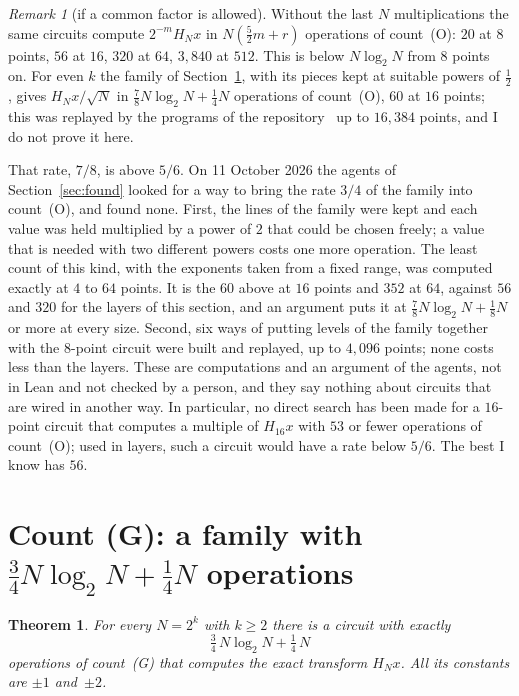 \documentclass[10pt]{article}
\newtheorem{theorem}{Theorem}
\theoremstyle{remark}
\newtheorem{remark}[proposition]{Remark}
\newcommand{\cntG}{\textup{(G)}}
\newcommand{\cntO}{\textup{(O)}}
\renewcommand{\lg}{\log_2}
\begin{document}
\begin{remark}[if a common factor is allowed]\label{rem:factor}
Without the last $N$ multiplications the same circuits compute $2^{-m}H_Nx$ in $N(\tfrac52m+r)$ operations of
count~\cntO: $20$ at $8$ points, $56$ at $16$, $320$ at $64$, $3{,}840$ at $512$. This is below $N\lg N$ from
$8$ points on. For even $k$ the family of Section~\ref{sec:B}, with its pieces kept at suitable powers of
$\tfrac12$, gives $H_Nx/\sqrt N$ in $\tfrac78N\lg N+\tfrac14N$ operations of count~\cntO, $60$ at $16$ points; this was
replayed by the programs of the repository~\cite{Repo} up to $16{,}384$ points, and I do not prove it here.

That rate, $7/8$, is above $5/6$. On 11 October 2026 the agents of Section~\ref{sec:found} looked for a way
to bring the rate $3/4$ of the family into count~\cntO, and found none. First, the lines of the family were
kept and each value was held multiplied by a power of $2$ that could be chosen freely; a value that is
needed with two different powers costs one more operation. The least count of this kind, with the exponents
taken from a fixed range, was computed exactly at $4$ to $64$ points. It is the $60$ above at $16$ points and $352$ at $64$, against $56$ and $320$
for the layers of this section, and an argument puts it at $\tfrac78N\lg N+\tfrac18N$ or more at every size.
Second, six ways of putting levels of the family together with the $8$-point circuit were built and
replayed, up to $4{,}096$ points; none costs less than the layers. These are computations and an argument of
the agents, not in Lean and not checked by a person, and they say nothing about circuits that are wired in another
way. In particular, no direct search has been made for a $16$-point circuit that computes a multiple of
$H_{16}x$ with $53$ or fewer operations of count~\cntO; used in layers, such a circuit would have a rate
below $5/6$. The best I know has $56$.
\end{remark}

\section{Count \cntG: a family with \texorpdfstring{$\tfrac34N\lg N+\tfrac14N$}{(3/4) N log N + N/4} operations}\label{sec:B}

\begin{theorem}\label{thm:B}
For every $N=2^k$ with $k\ge2$ there is a circuit with exactly
\[
\tfrac34\,N\lg N+\tfrac14\,N
\]
operations of count~\cntG{} that computes the exact transform $H_Nx$. All its constants are $\pm1$ and~$\pm2$.
\end{theorem}
\end{document}
